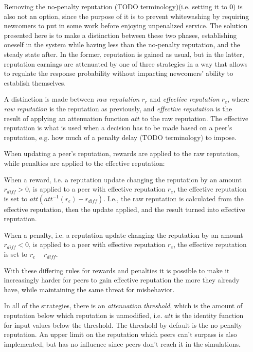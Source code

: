 Removing the no-penalty reputation (TODO terminology)(i.e. setting it to 0) is
also not an option, since the purpose of it is to prevent whitewashing by
requiring newcomers to put in some work before enjoying unpenalized service. The
solution presented here is to make a distinction between these two phases,
establishing oneself in the system while having less than the no-penalty
reputation, and the steady state after. In the former, reputation is gained as
usual, but in the latter, reputation earnings are attenuated by one of three
strategies in a way that allows to regulate the response probability without
impacting newcomers' ability to establish themselves.

A distinction is made between \emph{raw reputation} $r_r$ and \emph{effective
reputation} $r_e$, where \emph{raw reputation} is the reputation as previously,
and \emph{effective reputation} is the result of applying an attenuation
function $att$ to the raw reputation. The effective reputation is what is used
when a decision has to be made based on a peer's reputation, e.g. how much of a
penalty delay (TODO terminology) to impose.

When updating a peer's reputation, rewards are applied to the raw reputation,
while penalties are applied to the effective reputation:

When a reward, i.e. a reputation update changing the reputation by an amount
$r_{diff} > 0$, is applied to a peer with effective reputation $r_e$, the
effective reputation is set to $att(att^{-1}(r_e) + r_{diff})$. I.e., the raw
reputation is calculated from the effective reputation, then the update applied,
and the result turned into effective reputation.

When a penalty, i.e. a reputation update changing the reputation by an amount
$r_{diff} < 0$, is applied to a peer with effective reputation $r_e$, the
effective reputation is set to $r_e - r_{diff}$.

With these differing rules for rewards and penalties it is possible to make it
increasingly harder for peers to gain effective reputation the more they already
have, while maintaining the same threat for misbehavior.

In all of the strategies, there is an \emph{attenuation threshold}, which is the
amount of reputation below which reputation is unmodified, i.e. $att$ is the
identity function for input values below the threshold. The threshold by default
is the no-penalty reputation. An upper limit on the reputation which peers can't
surpass is also implemented, but has no influence since peers don't reach it in
the simulations.

